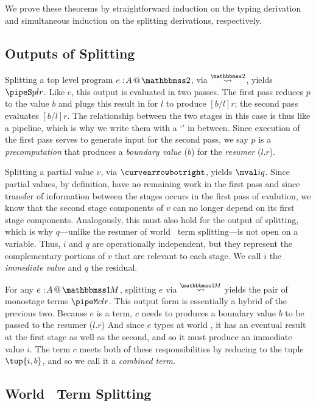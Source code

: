 \begin{abstrsyn}
We prove these theorems by straightforward induction on the typing derivation
and simultaneous induction on the splitting derivations, respectively.

\subsection{Outputs of Splitting}

Splitting a top level program $\coltwo e A$, via $\splittwosym$, yields $\pipeS p l r$.
Like $e$, this output is evaluated in two passes.
The first pass reduces $p$ to the value $b$ and plugs this result in for $l$ to produce $[b/l]r$;
the second pass evaluates $[b/l]r$.
The relationship between the two stages in this case is thus like a pipeline,
which is why we write them with a `\mytt{|}' in between.
Since execution of the first pass serves to generate input for
the second pass, we say $p$ is a {\em precomputation} that produces a
{\em boundary value} ($b$) for the {\em resumer} ($l.r$).

Splitting a partial value $v$, via $\vsplito$, yields $\mval i q$.
Since partial values, by definition, have no remaining work in the first pass
and since transfer of information between the stages occurs in the first pass of evalution,
we know that the second stage components of $v$ can no longer depend on its first stage components.
Analogously, this must also hold for the output of splitting, 
which is why $q$---unlike the resumer of world \bbtwo\ term splitting---is not open on a variable.
Thus, $i$ and $q$ are operationally independent, but they represent the complementary portions of $v$ that are relevant to each stage.
We call $i$ the \emph{immediate value} and $q$ the residual.

For any $\colmix e A$, splitting $e$ via $\splitonesym$ yields the pair of monostage terms $\pipeM c l r$. 
This output form is essentially a hybrid of the previous two.
Because $e$ is a term, $c$ needs to produces a boundary value $b$ to be passed to the resumer ($l.r$)
And since $e$ types at world \bbonem, it has an eventual result at the 
first stage as well as the second, and so it must produce an immediate value $i$.
The term $c$ meets both of these responsibilities by reducing to the tuple $\tup{i,b}$,
and so we call it a \emph{combined term}.

\subsection{World \bbtwo\ Term Splitting}


\end{abstrsyn}
